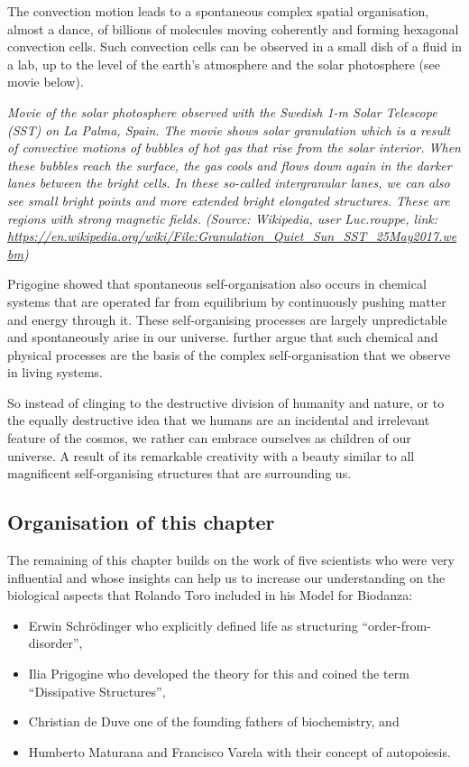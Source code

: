 \documentclass[
  11pt,
]{book}
\providecommand{\tightlist}{%
  \setlength{\itemsep}{0pt}\setlength{\parskip}{0pt}}
\begin{document}
The convection motion leads to a spontaneous complex spatial organisation, almost a dance, of billions of molecules moving coherently and forming hexagonal convection cells. Such convection cells can be observed in a small dish of a fluid in a lab, up to the level of the earth's atmosphere and the solar photosphere (see movie below).

\emph{Movie of the solar photosphere observed with the Swedish 1-m Solar Telescope (SST) on La Palma, Spain. The movie shows solar granulation which is a result of convective motions of bubbles of hot gas that rise from the solar interior. When these bubbles reach the surface, the gas cools and flows down again in the darker lanes between the bright cells. In these so-called intergranular lanes, we can also see small bright points and more extended bright elongated structures. These are regions with strong magnetic fields. (Source: Wikipedia, user Luc.rouppe, link: \url{https://en.wikipedia.org/wiki/File:Granulation_Quiet_Sun_SST_25May2017.webm})}

Prigogine showed that spontaneous self-organisation also occurs in chemical systems that are operated far from equilibrium by continuously pushing matter and energy through it. These self-organising processes are largely unpredictable and spontaneously arise in our universe.
\citet{prigogineStengers1984} further argue that such chemical and physical processes are the basis of the complex self-organisation that we observe in living systems.

So instead of clinging to the destructive division of humanity and nature, or to the equally destructive idea that we humans are an incidental and irrelevant feature of the cosmos, we rather can embrace ourselves as children of our universe. A result of its remarkable creativity with a beauty similar to all magnificent self-organising structures that are surrounding us.

\hypertarget{organisation-of-this-chapter}{%
\subsection{Organisation of this chapter}\label{organisation-of-this-chapter}}

The remaining of this chapter builds on the work of five scientists who were very influential and whose insights can help us to increase our understanding on the biological aspects that Rolando Toro included in his Model for Biodanza:

\begin{itemize}
\tightlist
\item
  Erwin Schrödinger who explicitly defined life as structuring ``order-from-disorder'',
\item
  Ilia Prigogine who developed the theory for this and coined the term ``Dissipative Structures'',
\item
  Christian de Duve one of the founding fathers of biochemistry, and
\item
  Humberto Maturana and Francisco Varela with their concept of autopoiesis.
\end{itemize}
\end{document}
